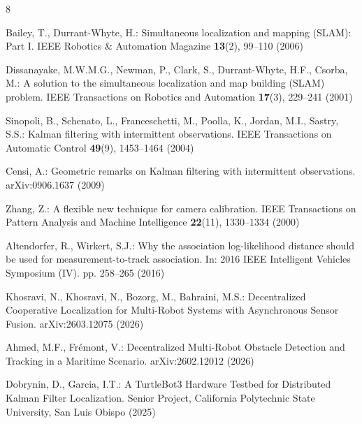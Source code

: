 \documentclass[runningheads]{llncs}
\begin{document}
\begin{thebibliography}{8}

Bailey, T., Durrant-Whyte, H.: Simultaneous localization and mapping
(SLAM): Part I. IEEE Robotics \& Automation Magazine \textbf{13}(2),
99--110 (2006)

Dissanayake, M.W.M.G., Newman, P., Clark, S., Durrant-Whyte, H.F.,
Csorba, M.: A solution to the simultaneous localization and map building
(SLAM) problem. IEEE Transactions on Robotics and Automation
\textbf{17}(3), 229--241 (2001)

Sinopoli, B., Schenato, L., Franceschetti, M., Poolla, K., Jordan, M.I.,
Sastry, S.S.: Kalman filtering with intermittent observations. IEEE
Transactions on Automatic Control \textbf{49}(9), 1453--1464 (2004)

Censi, A.: Geometric remarks on Kalman filtering with intermittent
observations. arXiv:0906.1637 (2009)

Zhang, Z.: A flexible new technique for camera calibration. IEEE
Transactions on Pattern Analysis and Machine Intelligence \textbf{22}(11),
1330--1334 (2000)

Altendorfer, R., Wirkert, S.J.: Why the association log-likelihood
distance should be used for measurement-to-track association. In: 2016
IEEE Intelligent Vehicles Symposium (IV). pp. 258--265 (2016)

Khosravi, N., Khosravi, N., Bozorg, M., Bahraini, M.S.: Decentralized
Cooperative Localization for Multi-Robot Systems with Asynchronous Sensor
Fusion. arXiv:2603.12075 (2026)

Ahmed, M.F., Fr\'emont, V.: Decentralized Multi-Robot Obstacle Detection
and Tracking in a Maritime Scenario. arXiv:2602.12012 (2026)

Dobrynin, D., Garcia, I.T.: A TurtleBot3 Hardware Testbed for Distributed
Kalman Filter Localization. Senior Project, California Polytechnic State
University, San Luis Obispo (2025)

\end{thebibliography}
\end{document}
